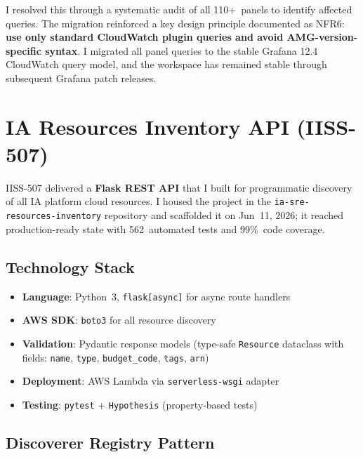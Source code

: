 I resolved this through a systematic audit of all 110+~panels to identify
affected queries. The migration reinforced a key design principle
documented as NFR6: \textbf{use only standard CloudWatch plugin queries
and avoid AMG-version-specific syntax}. I migrated all panel queries
to the stable Grafana 12.4 CloudWatch query model, and the workspace has
remained stable through subsequent Grafana patch releases.

\section{IA Resources Inventory API (IISS-507)}
\label{sec:inventory_api}

IISS-507 delivered a \textbf{Flask REST API} that I built for programmatic discovery
of all IA platform cloud resources. I housed the project in the
\texttt{ia-sre-resources-inventory} repository and scaffolded it on
Jun~11, 2026; it reached production-ready state with 562~automated
tests and 99\%~code coverage.

\subsection{Technology Stack}

\begin{itemize}
    \item \textbf{Language}: Python~3, \texttt{flask[async]} for async
          route handlers
    \item \textbf{AWS SDK}: \texttt{boto3} for all resource discovery
    \item \textbf{Validation}: Pydantic response models (type-safe
          \texttt{Resource} dataclass with fields: \texttt{name},
          \texttt{type}, \texttt{budget\_code}, \texttt{tags},
          \texttt{arn})
    \item \textbf{Deployment}: AWS Lambda via \texttt{serverless-wsgi}
          adapter
    \item \textbf{Testing}: \texttt{pytest} + \texttt{Hypothesis}
          (property-based tests)
\end{itemize}

\subsection{Discoverer Registry Pattern}

